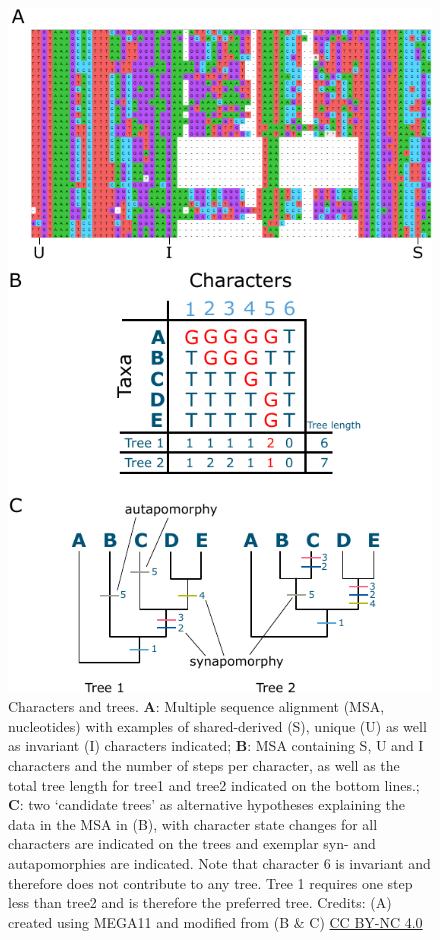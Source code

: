 \begin{figure}[!htbp]
\centering
\includegraphics[width=0.8\linewidth]{files/MSA_alt-889d2d785b8a5eb2edc29091c0208524.pdf}
\caption[]{Characters and trees.
\textbf{A}: Multiple sequence alignment (MSA, nucleotides) with examples of shared-derived (S), unique (U) as well as invariant (I) characters indicated; \textbf{B}: MSA containing S, U and I characters and the number of steps per character, as well as the total tree length for tree1 and tree2 indicated on the bottom lines.; \textbf{C}: two `candidate trees' as alternative hypotheses explaining the data in the MSA in (B), with character state changes for all characters are indicated on the trees and exemplar syn- and autapomorphies are indicated.
Note that character 6 is invariant and therefore does not contribute to any tree.
Tree 1 requires one step less than tree2 and is therefore the preferred tree.
Credits: (A) created using MEGA11 and modified from \cite{mega_2021} (B \& C) \href{https://creativecommons.org/licenses/by-nc/4.0/}{CC BY-NC 4.0} \cite{own_3_2024}}
\label{MSA_alt}
\end{figure}

